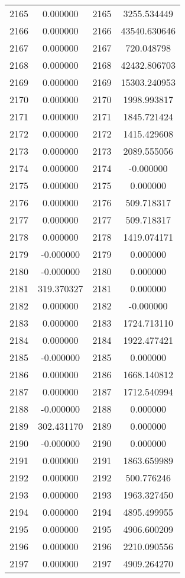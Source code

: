 \documentclass[12pt]{article}
\begin{document}
\begin{longtable}{@{}cccc@{}}
2165 & 0.000000 & 2165 & 3255.534449 \\
2166 & 0.000000 & 2166 & 43540.630646 \\
2167 & 0.000000 & 2167 & 720.048798 \\
2168 & 0.000000 & 2168 & 42432.806703 \\
2169 & 0.000000 & 2169 & 15303.240953 \\
2170 & 0.000000 & 2170 & 1998.993817 \\
2171 & 0.000000 & 2171 & 1845.721424 \\
2172 & 0.000000 & 2172 & 1415.429608 \\
2173 & 0.000000 & 2173 & 2089.555056 \\
2174 & 0.000000 & 2174 & -0.000000 \\
2175 & 0.000000 & 2175 & 0.000000 \\
2176 & 0.000000 & 2176 & 509.718317 \\
2177 & 0.000000 & 2177 & 509.718317 \\
2178 & 0.000000 & 2178 & 1419.074171 \\
2179 & -0.000000 & 2179 & 0.000000 \\
2180 & -0.000000 & 2180 & 0.000000 \\
2181 & 319.370327 & 2181 & 0.000000 \\
2182 & 0.000000 & 2182 & -0.000000 \\
2183 & 0.000000 & 2183 & 1724.713110 \\
2184 & 0.000000 & 2184 & 1922.477421 \\
2185 & -0.000000 & 2185 & 0.000000 \\
2186 & 0.000000 & 2186 & 1668.140812 \\
2187 & 0.000000 & 2187 & 1712.540994 \\
2188 & -0.000000 & 2188 & 0.000000 \\
2189 & 302.431170 & 2189 & 0.000000 \\
2190 & -0.000000 & 2190 & 0.000000 \\
2191 & 0.000000 & 2191 & 1863.659989 \\
2192 & 0.000000 & 2192 & 500.776246 \\
2193 & 0.000000 & 2193 & 1963.327450 \\
2194 & 0.000000 & 2194 & 4895.499955 \\
2195 & 0.000000 & 2195 & 4906.600209 \\
2196 & 0.000000 & 2196 & 2210.090556 \\
2197 & 0.000000 & 2197 & 4909.264270 \\

\end{longtable}
\end{document}
